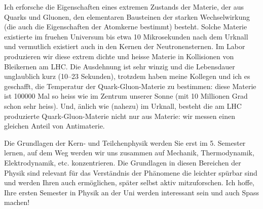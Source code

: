 \begin{multicols}{2}
Ich erforsche die Eigenschaften eines extremen Zustands der Materie, der aus Quarks und Gluonen, den elementaren Bausteinen der starken Wechselwirkung (die auch die Eigenschaften der Atomkerne bestimmt) besteht. Solche Materie existierte im fruehen Universum bis etwa 10 Mikrosekunden nach dem Urknall und vermutlich existiert auch in den Kernen der Neutronensternen. Im Labor produzieren wir diese extrem dichte und heisse Materie in Kollisionen von Bleikernen am LHC. Die Ausdehnung ist sehr winzig und die Lebensdauer unglaublich kurz (10--23 Sekunden), trotzdem haben meine Kollegen und ich es geschafft, die Temperatur der Quark-Gluon-Materie zu bestimmen: diese Materie ist 100000 Mal so heiss wie im
Zentrum unserer Sonne (mit 10 Millionen Grad schon sehr heiss). Und, änlich wie (nahezu) im Urknall, besteht die am LHC produzierte Quark-Gluon-Materie nicht nur aus Materie: wir messen einen gleichen Anteil von Antimaterie.

Die Grundlagen der Kern- und Teilchenphysik werden Sie erst im 5. Semester lernen, auf dem Weg werden wir uns zusammen auf Mechanik, Thermodynamik, Elektrodynamik, etc. konzentrieren. Die Grundlagen in diesen Bereichen der Physik sind relevant für das Verständnis der Phänomene die leichter spürbar sind und werden Ihren auch ermöglichen, später selbst aktiv mitzuforschen. Ich hoffe, Ihre ersten Semester in Physik an der Uni werden interessant sein und auch Spass machen!

\end{multicols}

\newpage

